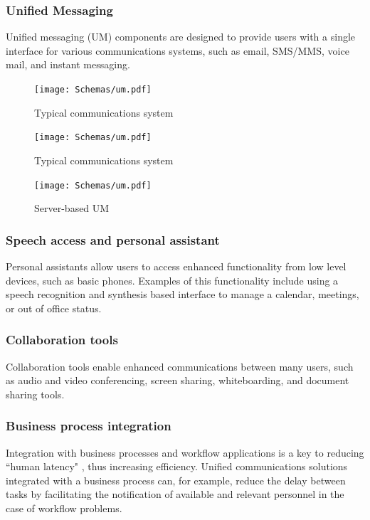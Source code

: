 \subsubsection{Unified Messaging}
Unified messaging (UM) components are designed to provide users with a single interface for various communications systems, such as email, SMS/MMS, voice mail, and instant messaging\cite{banner_understanding_2010}.
\begin{figure}[H]
	\centering
	\texttt{[image: Schemas/um.pdf]}
	\caption[Typical communications system]{Typical communications system}
	\label{fig:um_typical}
\end{figure}

\begin{figure}[H]
	\centering
	\texttt{[image: Schemas/um.pdf]}
	\caption[Client-based UM]{Typical communications system}
	\label{fig:um_client}
\end{figure}

\begin{figure}[H]
	\centering
	\texttt{[image: Schemas/um.pdf]}
	\caption{Server-based UM}
	\label{fig:um_server}
\end{figure}


\subsubsection{Speech access and personal assistant}
Personal assistants allow users to access enhanced functionality from low level devices, such as basic phones. Examples of this functionality include using a speech recognition and synthesis based interface to manage a calendar, meetings, or out of office status\cite{pleasant_what_2008}.


\subsubsection{Collaboration tools}
Collaboration tools enable enhanced communications between many users, such as audio and video conferencing, screen sharing, whiteboarding, and document sharing tools\cite{riemer_unified_2009}.

\subsubsection{Business process integration}
Integration with business processes and workflow applications is a key to reducing ``human latency" , thus increasing efficiency. Unified communications solutions integrated with a business process can, for example, reduce the delay between tasks by facilitating the notification of available and relevant personnel in the case of workflow problems\cite{pleasant_what_2008}.

